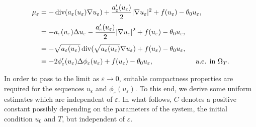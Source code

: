\documentclass[11pt,  reqno]{amsart}%
\theoremstyle{plain}
\theoremstyle{definition}
\theoremstyle{remark}
\numberwithin{equation}{section}
\newcommand{\ve}{\varepsilon}
\def\div{\,\mathrm{div}}
\begin{document}
    \begin{align}
    \mu_{\ve} & = - \div(a_{\ve}(u_{\ve}) \nabla  u_{\ve}) +\dfrac{a_{\ve}'(u_{\ve})}{2} |\nabla u_{\ve} |^2 + f(u_{\ve}) -\theta_0 u_{\ve}, \notag\\[3pt]
    &= - a_{\ve}(u_{\ve}) \Delta u_{\ve} -\dfrac{a_{\ve}'(u_{\ve})}{2} |\nabla u_{\ve} |^2 + f(u_{\ve}) -\theta_0 u_{\ve}, \notag\\[3pt]
    &= -\sqrt{a_\ve(u_\ve)}\div(\sqrt{a_\ve(u_\ve)} \nabla u_\ve) + f(u_{\ve}) -\theta_0 u_{\ve} , \notag\\[3pt]\label{newformulation}
    &= -2 \phi_\ve'(u_\ve)\Delta \phi_\ve(u_\ve) + f(u_{\ve}) -\theta_0 u_{\ve}, \hspace{2.0 cm} \textrm{ a.e. in }\Omega_T. 
    \end{align}
     
In order to pass to the limit as $\ve \to 0$, suitable compactness properties are required for the sequences $u_\ve$ and $\phi_\ve(u_\ve)$. To this end, we derive some uniform estimates which are independent of $\ve$. In what follows, $C$ denotes a positive constant possibly depending on the parameters of the system, the initial condition $u_0$ and $T$, but independent of $\ve$.
	
\end{document}

